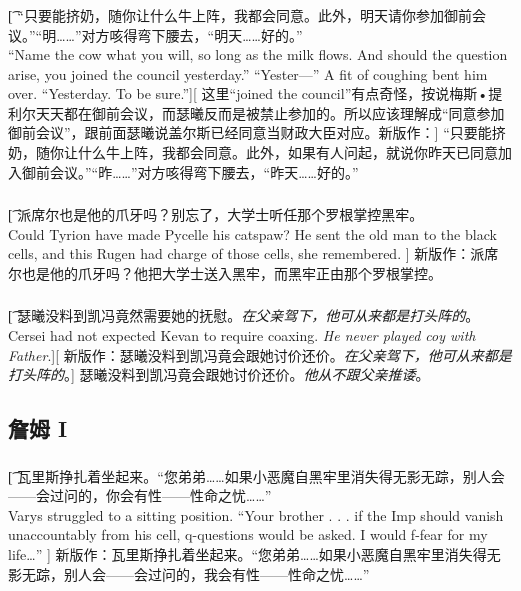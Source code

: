 \documentclass[12pt,a4paper]{article}
\begin{document}
\subsubsection{}\t[
	“只要能挤奶，随你让什么牛上阵，我都会同意。此外，明天请你参加御前会议。”“明……”对方咳得弯下腰去，“明天……好的。”\\
	“Name the cow what you will, so long as the milk flows. And should the question arise, you joined the council yesterday.” “Yester—” A fit of coughing bent him over. “Yesterday. To be sure.”][
	这里“joined the council”有点奇怪，按说梅斯•提利尔天天都在御前会议，而瑟曦反而是被禁止参加的。所以应该理解成“同意参加御前会议”，跟前面瑟曦说盖尔斯已经同意当财政大臣对应。新版作：]
	“只要能挤奶，随你让什么牛上阵，我都会同意。此外，如果有人问起，就说你昨天已同意加入御前会议。”“昨……”对方咳得弯下腰去，“昨天……好的。”
	
\subsubsection{}\t[
	派席尔也是他的爪牙吗？别忘了，大学士听任那个罗根掌控黑牢。\\
	Could Tyrion have made Pycelle his catspaw? He sent the old man to the black cells, and this Rugen had charge of those cells, she remembered. ]
	新版作：派席尔也是他的爪牙吗？他把大学士送入黑牢，而黑牢正由那个罗根掌控。
	
\subsubsection{}\t[
	瑟曦没料到凯冯竟然需要她的抚慰。\emph{在父亲驾下，他可从来都是打头阵的}。\\
	Cersei had not expected Kevan to require coaxing. \emph{He never played coy with Father}.][
	新版作：瑟曦没料到凯冯竟会跟她讨价还价。\emph{在父亲驾下，他可从来都是打头阵的}。]
	瑟曦没料到凯冯竟会跟她讨价还价。\emph{他从不跟父亲推诿}。
	
\subsection{詹姆 I}
\subsubsection{}\t[
	瓦里斯挣扎着坐起来。“您弟弟……如果小恶魔自黑牢里消失得无影无踪，别人会——会过问的，你会有性——性命之忧……”\\
	Varys struggled to a sitting position. “Your brother . . . if the Imp should vanish unaccountably from his cell, q-questions would be asked. I would f-fear for my life\ldots” ]
	新版作：瓦里斯挣扎着坐起来。“您弟弟……如果小恶魔自黑牢里消失得无影无踪，别人会——会过问的，我会有性——性命之忧……”
	
\end{document}
